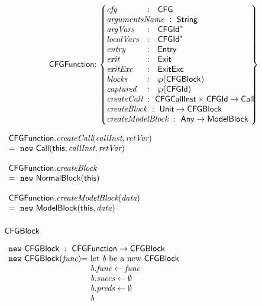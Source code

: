 \vspace*{-2em}
\[
\begin{array}{@{~}r@{~}l@{}l@{~}l}
& \CFGFunction & : &
\begin{Bmatrix*}[l]
\emph{cfg}  & : & \CFG \\
\lefteqn{\emph{argumentsName} \ : \ \String} \\
\emph{argVars} & : & \CFGId^{*} \\
\emph{localVars} & : & \CFGId^{*} \\
\emph{entry} & : & \Entry \\
\emph{exit} & : & \Exit \\
\emph{exitExc} & : & \ExitExc \\
\emph{blocks} & : & \powerset{\CFGBlock}
~~~~~~~~~~~~~~~~~\\
\emph{captured} & : & \powerset{\CFGId} \\
\lefteqn{\emph{createCall} \ : \ \CFGCallInst \times \CFGId \rightarrow \Call} \\
\lefteqn{\emph{createBlock} \ : \ \Unit \rightarrow \CFGBlock} \\
\lefteqn{\emph{createModelBlock} \ : \ \Any \rightarrow \ModelBlock} \\
\end{Bmatrix*}
\end{array}
\]

\hspace*{-2em}
$
\begin{array}{l}
\CFGFunction.\emph{createCall}(\emph{callInst}, \emph{retVar})\\
= \ \new\ \Call(\this, \emph{callInst}, \emph{retVar})\\\\

\CFGFunction.\emph{createBlock}\\
= \ \new\ \NormalBlock(\this)\\\\

\CFGFunction.\emph{createModelBlock}(\emph{data})\\
= \ \new\ \ModelBlock(\this, \emph{data})\\
\end{array}
$

\subsubsection{$\mbox{\textsf{CFGBlock}}$}
$
\begin{array}{l@{}l@{~}l}
\lefteqn{\new \ \CFGBlock \ : \ \CFGFunction \rightarrow \CFGBlock} \\
\new\ \CFGBlock(\emph{func})
& = & \text{let } \emph{b} \text{ be a new } \CFGBlock\\
& & \emph{b}.\emph{func} \leftarrow \emph{func}\\
& & \emph{b}.\emph{succs} \leftarrow \emptyset\\
& & \emph{b}.\emph{preds} \leftarrow \emptyset\\
& & \emph{b}\\
\end{array}
$

